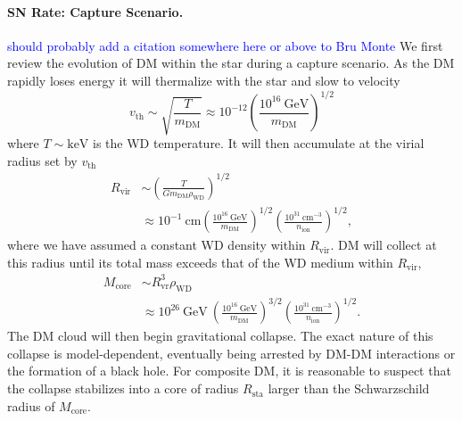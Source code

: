 \documentclass[twocolumn, preprintnumbers,amsmath,amssymb,prd, superscriptaddress]{revtex4}
\newcommand{\GeV}{\text{GeV}}
\newcommand{\keV}{\text{keV}}
\newcommand{\cm}{\text{cm}}
\def\r{\right)}
\def\l{\left(}
\begin{document}
\paragraph{SN Rate: Capture Scenario.}
\textcolor{blue}{should probably add a citation somewhere here or above to Bru Monte}
We first review the evolution of DM within the star during a capture scenario.
As the DM rapidly loses energy it will thermalize with the star and slow to velocity
\begin{equation}
v_\text{th} \sim \sqrt{\frac{T}{m_\text{DM}}} \approx 10^{-12} \l \frac{10^{16} ~\GeV}{m_\text{DM}}\r^{1/2}
\end{equation}
where $T \sim \keV$ is the WD temperature.
It will then accumulate at the virial radius set by $v_\text{th}$
\begin{align}
  R_\text{vir} &\sim \l \frac{T}{G m_\text{DM} \rho_\text{WD}}\r^{1/2} \\
  &\approx 10^{-1} ~\text{cm} \l \frac{10^{16} ~\GeV}{m_\text{DM}}\r^{1/2}
  \l \frac{10^{31} ~\cm^{-3}}{n_\text{ion}}\r^{1/2}, \nonumber
\end{align}
where we have assumed a constant WD density within $R_\text{vir}$.
DM will collect at this radius until its total mass exceeds that of the WD medium within $R_\text{vir}$,
\begin{align}
    M_\text{core} &\sim R^3_\text{vr} \rho_\text{WD} \\
    &\approx 10^{26}~\GeV ~\l \frac{10^{16} ~\GeV}{m_\text{DM}}\r^{3/2}
  \l \frac{10^{31} ~\cm^{-3}}{n_\text{ion}}\r^{1/2}. \nonumber
\end{align}
The DM cloud will then begin gravitational collapse.
The exact nature of this collapse is model-dependent, eventually being arrested by DM-DM interactions or the formation of a black hole.
For composite DM, it is reasonable to suspect that the collapse stabilizes into a core of radius $R_\text{sta}$ larger than the Schwarzschild radius of $M_\text{core}$.
\end{document}
